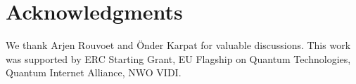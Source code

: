 \section*{Acknowledgments}

We thank Arjen Rouvoet and \"Onder Karpat for valuable discussions. This work was supported by ERC
Starting Grant, EU Flagship on Quantum Technologies, Quantum Internet Alliance,
NWO VIDI.
